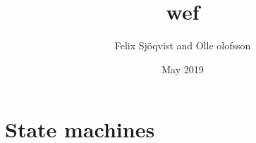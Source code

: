 \documentclass{article}
\title{wef}
\author{Felix Sjöqvist and Olle olofsson }
\date{May 2019}
\begin{document}
\maketitle

\section{State machines}
\end{document}
